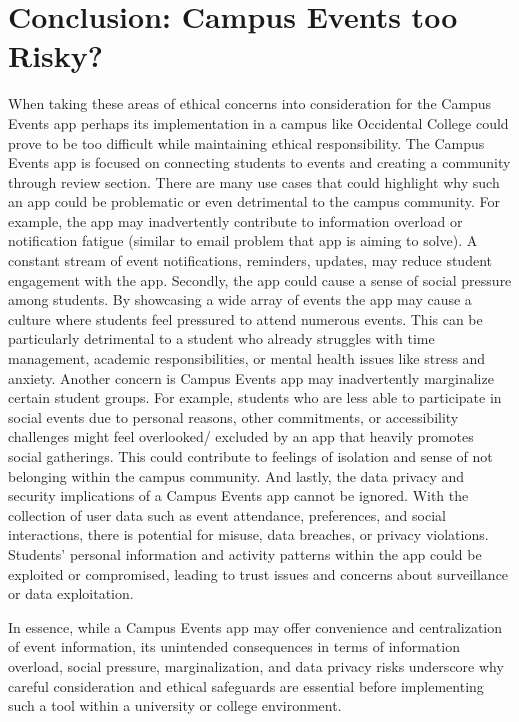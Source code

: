 \documentclass[10pt,twocolumn]{article}
\begin{document}
\section{Conclusion: Campus Events too Risky?}
When taking these areas of ethical concerns into consideration for the Campus Events app perhaps its implementation in a campus like Occidental College could prove to be too difficult while maintaining ethical responsibility. The Campus Events app is focused on connecting students to events and creating a community through review section. There are many use cases that could highlight why such an app could be problematic or even detrimental to the campus community.
For example, the app may inadvertently contribute to information overload or notification fatigue (similar to email problem that app is aiming to solve). A constant stream of event notifications, reminders, updates, may reduce student engagement with the app. 
Secondly, the app could cause a sense of social pressure among students. By showcasing a wide array of events the app may cause a culture where students feel pressured to attend numerous events. This can be particularly detrimental to a student who already struggles with time management, academic responsibilities, or mental health issues like stress and anxiety.
Another concern is Campus Events app may inadvertently marginalize certain student groups. For example, students who are less able to participate in social events due to personal reasons, other commitments, or accessibility challenges might feel overlooked/ excluded by an app that heavily promotes social gatherings. This could contribute to feelings of isolation and sense of not belonging within the campus community.
And lastly, the data privacy and security implications of a Campus Events app cannot be ignored. With the collection of user data such as event attendance, preferences, and social interactions, there is potential for misuse, data breaches, or privacy violations. Students' personal information and activity patterns within the app could be exploited or compromised, leading to trust issues and concerns about surveillance or data exploitation.

In essence, while a Campus Events app may offer convenience and centralization of event information, its unintended consequences in terms of information overload, social pressure, marginalization, and data privacy risks underscore why careful consideration and ethical safeguards are essential before implementing such a tool within a university or college environment.

\printbibliography
\end{document}
